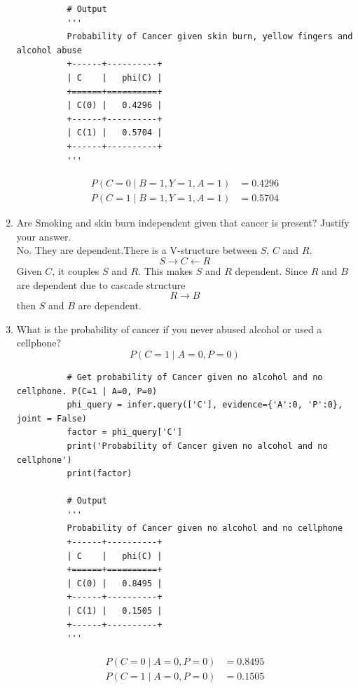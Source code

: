 \begin{enumerate}
\begin{lstlisting}
          # Output
          '''
          Probability of Cancer given skin burn, yellow fingers and alcohol abuse
          +------+----------+
          | C    |   phi(C) |
          +======+==========+
          | C(0) |   0.4296 |
          +------+----------+
          | C(1) |   0.5704 |
          +------+----------+
          '''
        \end{lstlisting}
        \begin{align*}
          P(C=0\mid B=1, Y=1, A=1) & =0.4296 \\
          P(C=1\mid B=1, Y=1, A=1) & =0.5704
        \end{align*}
  \item Are Smoking and skin burn independent given that cancer is present? Justify your answer.\\
        No. They are dependent.There is a V-structure between $S$, $C$ and $R$.
        $$S\rightarrow C\leftarrow R$$
        Given $C$, it couples $S$ and $R$. This makes $S$ and $R$ dependent. Since $R$ and $B$ are dependent due to cascade structure
        $$R \rightarrow B$$
        then $S$ and $B$ are dependent.
  \item What is the probability of cancer if you never abused alcohol or used a cellphone?
        $$P(C=1\mid A=0, P=0)$$
        \begin{lstlisting}
          # Get probability of Cancer given no alcohol and no cellphone. P(C=1 | A=0, P=0)
          phi_query = infer.query(['C'], evidence={'A':0, 'P':0}, joint = False)
          factor = phi_query['C']
          print('Probability of Cancer given no alcohol and no cellphone')
          print(factor)

          # Output
          '''
          Probability of Cancer given no alcohol and no cellphone
          +------+----------+
          | C    |   phi(C) |
          +======+==========+
          | C(0) |   0.8495 |
          +------+----------+
          | C(1) |   0.1505 |
          +------+----------+
          '''
        \end{lstlisting}
        \begin{align*}
          P(C=0\mid A=0, P=0) & =0.8495 \\
          P(C=1\mid A=0, P=0) & =0.1505
        \end{align*}
\end{enumerate}